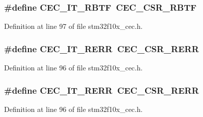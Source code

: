 \subsubsection[{\texorpdfstring{C\+E\+C\+\_\+\+I\+T\+\_\+\+R\+B\+TF}{CEC_IT_RBTF}}]{\setlength{\rightskip}{0pt plus 5cm}\#define C\+E\+C\+\_\+\+I\+T\+\_\+\+R\+B\+TF~{\bf C\+E\+C\+\_\+\+C\+S\+R\+\_\+\+R\+B\+TF}}\hypertarget{group___c_e_c__interrupts__definition_ga42834131bf077a878e84470ae98f1bb4}{}\label{group___c_e_c__interrupts__definition_ga42834131bf077a878e84470ae98f1bb4}


Definition at line 97 of file stm32f10x\+\_\+cec.\+h.

\subsubsection[{\texorpdfstring{C\+E\+C\+\_\+\+I\+T\+\_\+\+R\+E\+RR}{CEC_IT_RERR}}]{\setlength{\rightskip}{0pt plus 5cm}\#define C\+E\+C\+\_\+\+I\+T\+\_\+\+R\+E\+RR~{\bf C\+E\+C\+\_\+\+C\+S\+R\+\_\+\+R\+E\+RR}}\hypertarget{group___c_e_c__interrupts__definition_gac015ebba728a69eeb84be1bc56a58ac0}{}\label{group___c_e_c__interrupts__definition_gac015ebba728a69eeb84be1bc56a58ac0}


Definition at line 96 of file stm32f10x\+\_\+cec.\+h.

\subsubsection[{\texorpdfstring{C\+E\+C\+\_\+\+I\+T\+\_\+\+R\+E\+RR}{CEC_IT_RERR}}]{\setlength{\rightskip}{0pt plus 5cm}\#define C\+E\+C\+\_\+\+I\+T\+\_\+\+R\+E\+RR~{\bf C\+E\+C\+\_\+\+C\+S\+R\+\_\+\+R\+E\+RR}}\hypertarget{group___c_e_c__interrupts__definition_gac015ebba728a69eeb84be1bc56a58ac0}{}\label{group___c_e_c__interrupts__definition_gac015ebba728a69eeb84be1bc56a58ac0}


Definition at line 96 of file stm32f10x\+\_\+cec.\+h.

